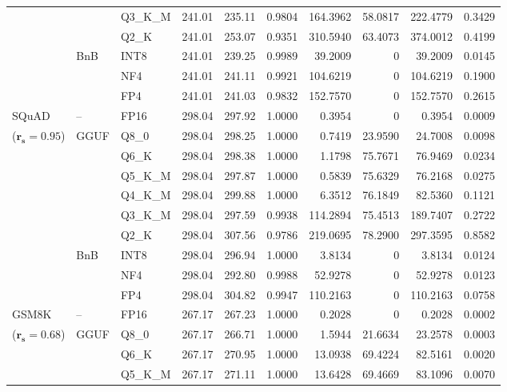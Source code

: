 \begin{longtable}{ll l rrrrrrr}
 &  & Q3\_K\_M & 241.01 & 235.11 & 0.9804 & 164.3962 & 58.0817 & 222.4779 & 0.3429 \\
 &  & Q2\_K & 241.01 & 253.07 & \cellcolor{red!18} 0.9351 & \cellcolor{red!18} 310.5940 & 63.4073 & \cellcolor{red!18} 374.0012 & \cellcolor{red!18} 0.4199 \\
 & BnB & INT8 & 241.01 & 239.25 & 0.9989 & 39.2009 & \cellcolor{cyan!12} $0$ & 39.2009 & 0.0145 \\
 &  & NF4 & 241.01 & 241.11 & 0.9921 & 104.6219 & \cellcolor{cyan!12} $0$ & 104.6219 & 0.1900 \\
 &  & FP4 & 241.01 & 241.03 & 0.9832 & 152.7570 & \cellcolor{cyan!12} $0$ & 152.7570 & 0.2615 \\
\midrule
SQuAD & -- & FP16 & 298.04 & 297.92 & 1.0000 & 0.3954 & \cellcolor{cyan!12} $0$ & 0.3954 & 0.0009 \\
{\small ($\mathbf{r_s{=}0.95}$)} & GGUF & Q8\_0 & 298.04 & 298.25 & 1.0000 & 0.7419 & 23.9590 & 24.7008 & 0.0098 \\
 &  & Q6\_K & 298.04 & 298.38 & 1.0000 & 1.1798 & 75.7671 & 76.9469 & 0.0234 \\
 &  & Q5\_K\_M & 298.04 & 297.87 & 1.0000 & 0.5839 & 75.6329 & 76.2168 & 0.0275 \\
 &  & Q4\_K\_M & 298.04 & 299.88 & 1.0000 & 6.3512 & 76.1849 & 82.5360 & 0.1121 \\
 &  & Q3\_K\_M & 298.04 & 297.59 & 0.9938 & 114.2894 & 75.4513 & 189.7407 & 0.2722 \\
 &  & Q2\_K & 298.04 & 307.56 & 0.9786 & 219.0695 & 78.2900 & 297.3595 & 0.8582 \\
 & BnB & INT8 & 298.04 & 296.94 & 1.0000 & 3.8134 & \cellcolor{cyan!12} $0$ & 3.8134 & 0.0124 \\
 &  & NF4 & 298.04 & 292.80 & 0.9988 & 52.9278 & \cellcolor{cyan!12} $0$ & 52.9278 & 0.0123 \\
 &  & FP4 & 298.04 & 304.82 & 0.9947 & 110.2163 & \cellcolor{cyan!12} $0$ & 110.2163 & 0.0758 \\
\midrule
GSM8K & -- & FP16 & 267.17 & 267.23 & 1.0000 & 0.2028 & \cellcolor{cyan!12} $0$ & 0.2028 & 0.0002 \\
{\small ($\mathbf{r_s{=}0.68}$)} & GGUF & Q8\_0 & 267.17 & 266.71 & 1.0000 & 1.5944 & 21.6634 & 23.2578 & 0.0003 \\
 &  & Q6\_K & 267.17 & 270.95 & 1.0000 & 13.0938 & 69.4224 & 82.5161 & 0.0020 \\
 &  & Q5\_K\_M & 267.17 & 271.11 & 1.0000 & 13.6428 & 69.4669 & 83.1096 & 0.0070 \\

\end{longtable}
